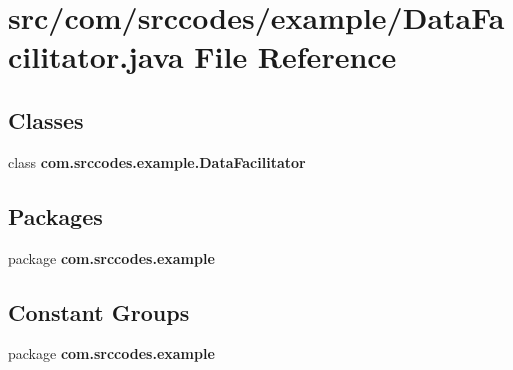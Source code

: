 \section{src/com/srccodes/example/\-Data\-Facilitator.java File Reference}
\label{_data_facilitator_8java}
\subsection*{Classes}
\begin{DoxyCompactItemize}
\item 
class {\bf com.\-srccodes.\-example.\-Data\-Facilitator}
\end{DoxyCompactItemize}
\subsection*{Packages}
\begin{DoxyCompactItemize}
\item 
package {\bf com.\-srccodes.\-example}
\end{DoxyCompactItemize}
\subsection*{Constant Groups}
\begin{DoxyCompactItemize}
\item 
package {\bf com.\-srccodes.\-example}
\end{DoxyCompactItemize}
